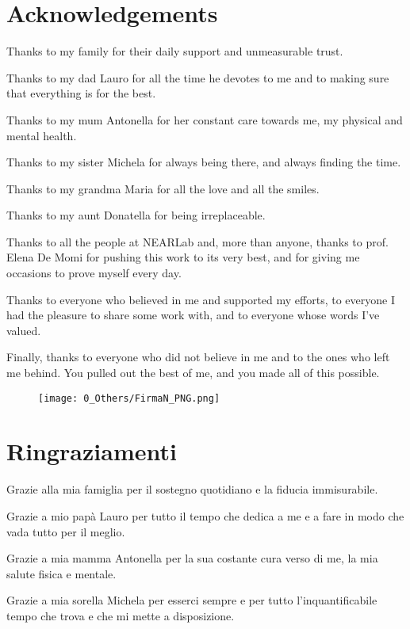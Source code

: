 \documentclass[../main.tex]{subfiles}
\begin{document}
\chapter*{Acknowledgements}
Thanks to my family for their daily support and unmeasurable trust. 

Thanks to my dad Lauro for all the time he devotes to me and to making sure that everything is for the best. 

Thanks to my mum Antonella for her constant care towards me, my physical and mental health. 

Thanks to my sister Michela for always being there, and always finding the time. 

Thanks to my grandma Maria for all the love and all the smiles.

Thanks to my aunt Donatella for being irreplaceable.

Thanks to all the people at NEARLab and, more than anyone, thanks to prof. Elena De Momi for pushing this work to its very best, and for giving me occasions to prove myself every day.

Thanks to everyone who believed in me and supported my efforts, to everyone I had the pleasure to share some work with, and to everyone whose words I've valued. 

Finally, thanks to everyone who did not believe in me and to the ones who left me behind. You pulled out the best of me, and you made all of this possible. 
\vspace{0.5cm}
\begin{figure}[h!]
    \raggedright 
    \texttt{[image: 0\_Others/FirmaN\_PNG.png]}
\end{figure}
\newpage
{}
\chapter*{Ringraziamenti}
Grazie alla mia famiglia per il sostegno quotidiano e la fiducia immisurabile. 

Grazie a mio papà Lauro per tutto il tempo che dedica a me e a fare in modo che vada tutto per il meglio.

Grazie a mia mamma Antonella per la sua costante cura verso di me, la mia salute fisica e mentale. 

Grazie a mia sorella Michela per esserci sempre e per tutto l'inquantificabile tempo che trova e che mi mette a disposizione. 
\end{document}
